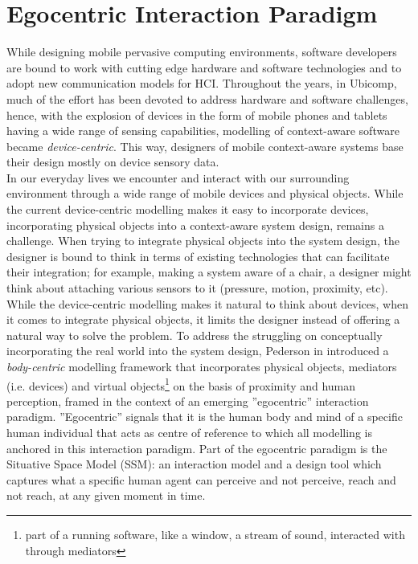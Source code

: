 \section{Egocentric Interaction Paradigm}\label{sec:intro_egocentric_paradigm}
While designing mobile pervasive computing environments, software developers are bound to work with cutting edge hardware and software technologies and to adopt new communication models for HCI. Throughout the years, in Ubicomp, much of the effort has been devoted to address hardware and software challenges, hence, with the explosion of devices in the form of mobile phones and tablets having a wide range of sensing capabilities, modelling of context-aware software became \emph{device-centric}. This way, designers of mobile context-aware systems base their design mostly on device sensory data.\\

In our everyday lives we encounter and interact with our surrounding environment through a wide range of mobile devices and physical objects. While the current device-centric modelling makes it easy to incorporate devices, incorporating physical objects into a context-aware system design, remains a challenge. When trying to integrate physical objects into the system design, the designer is bound to think in terms of existing technologies that can facilitate their integration; for example, making a system aware of a chair, a designer might think about attaching various sensors to it (pressure, motion, proximity, etc). While the device-centric modelling makes it natural to think about devices, when it comes to integrate physical objects, it limits the designer instead of offering a natural way to solve the problem. To address the struggling on conceptually incorporating the real world into the system design, Pederson in \cite{pederson2010towards} introduced a \emph{body-centric} modelling framework that incorporates physical objects, mediators (i.e. devices) and virtual objects\footnote{part of a running software, like a window, a stream of sound, interacted with through mediators} on the basis of proximity and human perception, framed in the context of an emerging ''egocentric'' interaction paradigm. ''Egocentric'' signals that it is the human body and mind of a specific human individual that acts as centre of reference to which all modelling is anchored in this interaction paradigm. Part of the egocentric paradigm is the Situative Space Model (SSM): an interaction model and a design tool which captures what a specific human agent can perceive and not perceive, reach and not reach, at any given moment in time.\\

